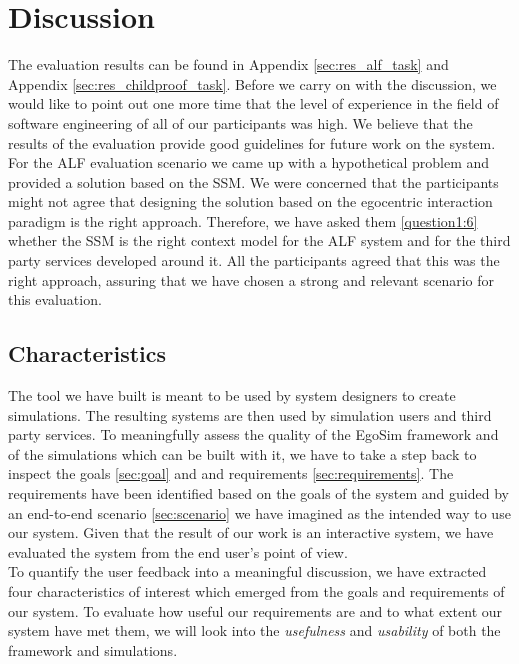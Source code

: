 \section{Discussion} %
\label{sec:eval_discussion}
The evaluation results can be found in Appendix \ref{sec:res_alf_task} and Appendix \ref{sec:res_childproof_task}. Before we carry on with the discussion, we would like to point out one more time that the level of experience in the field of software engineering of all of our participants was high. We believe that the results of the evaluation provide good guidelines for future work on the system.\\

For the ALF evaluation scenario we came up with a hypothetical problem and provided a solution based on the SSM. We were concerned that the participants might not agree that designing the solution based on the egocentric interaction paradigm is the right approach. Therefore, we have asked them \ref{question1:6} whether the SSM is the right context model for the ALF system and for the third party services developed around it. All the participants agreed that this was the right approach, assuring that we have chosen a strong and relevant scenario for this evaluation.\\

\subsection{Characteristics} %
\label{sec:eval_characteristics}
The tool we have built is meant to be used by system designers to create simulations. The resulting systems are then used by simulation users and third party services. To meaningfully assess the quality of the EgoSim framework and of the simulations which can be built with it, we have to take a step back to inspect the goals \ref{sec:goal} and and requirements \ref{sec:requirements}. The requirements have been identified based on the goals of the system and guided by an end-to-end scenario \ref{sec:scenario} we have imagined as the intended way to use our system. Given that the result of our work is an interactive system, we have evaluated the system from the end user's point of view.\\

To quantify the user feedback into a meaningful discussion, we have extracted four characteristics of interest which emerged from the goals and requirements of our system. To evaluate how useful our requirements are and to what extent our system have met them, we will look into the \emph{usefulness} and \emph{usability} of both the framework and simulations.\\

